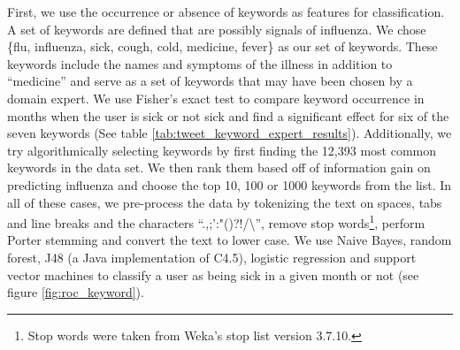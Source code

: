 \documentclass{sig-alternate-2013}
\begin{document}
First, we use the occurrence or absence of keywords as features for classification. A set of keywords are defined that are possibly signals of influenza. We chose \{flu, influenza, sick, cough, cold, medicine, fever\} as our set of keywords. These keywords include the names and symptoms of the illness in addition to ``medicine'' and serve as a set of keywords that may have been chosen by a domain expert. We use Fisher's exact test to compare keyword occurrence in months when the user is sick or not sick and find a significant effect for six of the seven keywords (See table \ref{tab:tweet_keyword_expert_results}). Additionally, we try algorithmically selecting keywords by first finding the 12,393 most common keywords in the data set.  We then rank them based off of information gain on predicting influenza and choose the top 10, 100 or 1000 keywords from the list. In all of these cases, we pre-process the data by tokenizing the text on spaces, tabs and line breaks and the characters ``.,;':"()?!/\textbackslash '', remove stop words\footnote{Stop words were taken from Weka's stop list version 3.7.10.}, perform Porter stemming \cite{Porter:1980dd}  and convert the text to lower case. We use Naive Bayes, random forest, J48 (a Java implementation of C4.5), logistic regression and support vector machines to classify a user as being sick in a given month or not (see figure \ref{fig:roc_keyword}).
\end{document}
